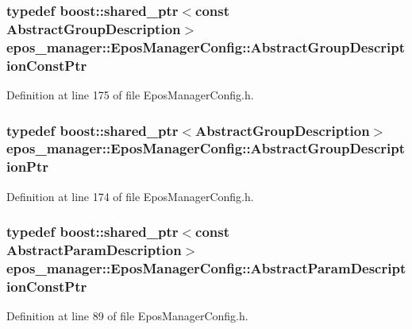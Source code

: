 \subsubsection[{\-Abstract\-Group\-Description\-Const\-Ptr}]{\setlength{\rightskip}{0pt plus 5cm}typedef boost\-::shared\-\_\-ptr$<$const {\bf \-Abstract\-Group\-Description}$>$ {\bf epos\-\_\-manager\-::\-Epos\-Manager\-Config\-::\-Abstract\-Group\-Description\-Const\-Ptr}}\label{classepos__manager_1_1EposManagerConfig_abf48ed275115aa985eeb90a6389c0ca6}


\-Definition at line 175 of file \-Epos\-Manager\-Config.\-h.

\subsubsection[{\-Abstract\-Group\-Description\-Ptr}]{\setlength{\rightskip}{0pt plus 5cm}typedef boost\-::shared\-\_\-ptr$<${\bf \-Abstract\-Group\-Description}$>$ {\bf epos\-\_\-manager\-::\-Epos\-Manager\-Config\-::\-Abstract\-Group\-Description\-Ptr}}\label{classepos__manager_1_1EposManagerConfig_abc73f357916eac92cc3038e0762024c6}


\-Definition at line 174 of file \-Epos\-Manager\-Config.\-h.

\subsubsection[{\-Abstract\-Param\-Description\-Const\-Ptr}]{\setlength{\rightskip}{0pt plus 5cm}typedef boost\-::shared\-\_\-ptr$<$const {\bf \-Abstract\-Param\-Description}$>$ {\bf epos\-\_\-manager\-::\-Epos\-Manager\-Config\-::\-Abstract\-Param\-Description\-Const\-Ptr}}\label{classepos__manager_1_1EposManagerConfig_aff0ce6e345378aba6757598863cd92de}


\-Definition at line 89 of file \-Epos\-Manager\-Config.\-h.

